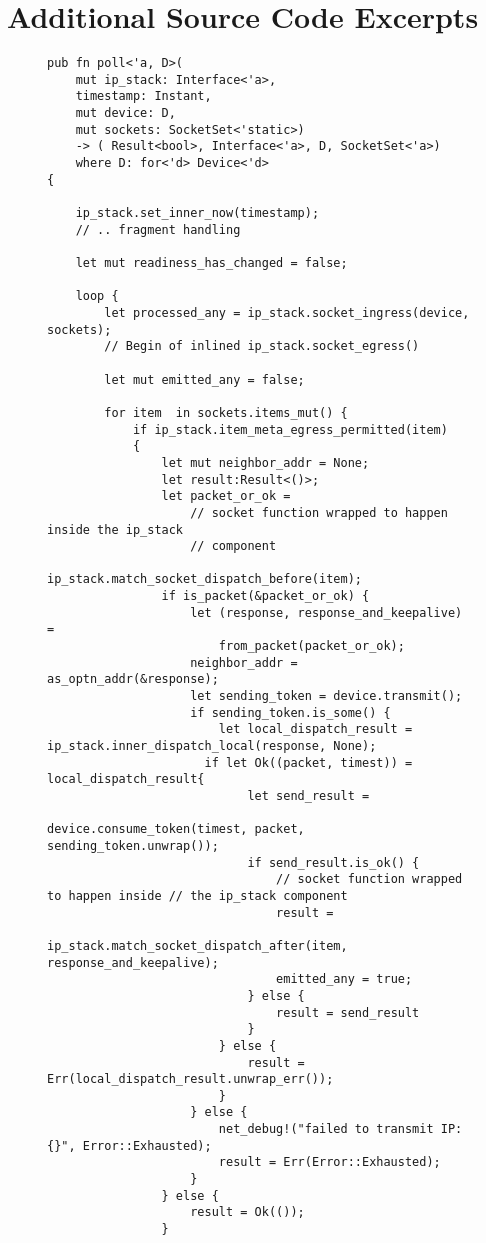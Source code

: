 \section{Additional Source Code Excerpts}

\begin{figure}[H]
\centering
\begin{verbatim}
pub fn poll<'a, D>(
    mut ip_stack: Interface<'a>,
    timestamp: Instant,
    mut device: D,
    mut sockets: SocketSet<'static>)
    -> ( Result<bool>, Interface<'a>, D, SocketSet<'a>)
    where D: for<'d> Device<'d>
{

    ip_stack.set_inner_now(timestamp);
    // .. fragment handling

    let mut readiness_has_changed = false;

    loop {
        let processed_any = ip_stack.socket_ingress(device, sockets);
        // Begin of inlined ip_stack.socket_egress()

        let mut emitted_any = false;

        for item  in sockets.items_mut() {
            if ip_stack.item_meta_egress_permitted(item)
            {
                let mut neighbor_addr = None;
                let result:Result<()>;
                let packet_or_ok =
                    // socket function wrapped to happen inside the ip_stack
                    // component
                    ip_stack.match_socket_dispatch_before(item);
                if is_packet(&packet_or_ok) {
                    let (response, response_and_keepalive) =
                        from_packet(packet_or_ok);
                    neighbor_addr = as_optn_addr(&response);
                    let sending_token = device.transmit();
                    if sending_token.is_some() {
                        let local_dispatch_result = ip_stack.inner_dispatch_local(response, None);
                      if let Ok((packet, timest)) = local_dispatch_result{
                            let send_result =
                                device.consume_token(timest, packet, sending_token.unwrap());
                            if send_result.is_ok() {
                                // socket function wrapped to happen inside // the ip_stack component
                                result = 
                                ip_stack.match_socket_dispatch_after(item, response_and_keepalive);
                                emitted_any = true;
                            } else {
                                result = send_result
                            }
                        } else {
                            result = Err(local_dispatch_result.unwrap_err());
                        }
                    } else {
                        net_debug!("failed to transmit IP: {}", Error::Exhausted);
                        result = Err(Error::Exhausted);
                    }
                } else {
                    result = Ok(());
                }


\end{verbatim}
\end{figure}

